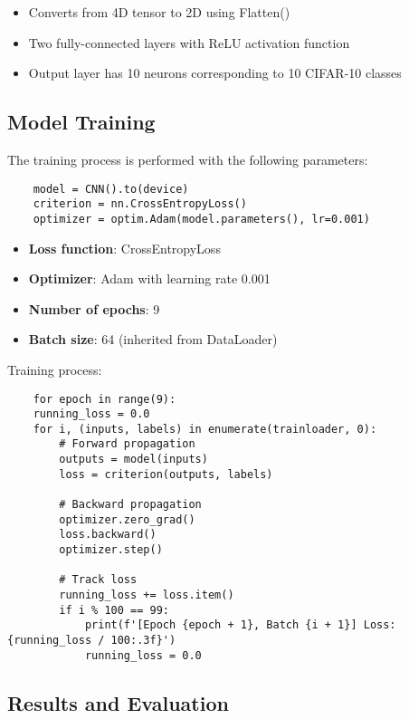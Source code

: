 \documentclass[12pt]{article}
\begin{document}
\begin{itemize}
    \item Converts from 4D tensor to 2D using Flatten()
    \item Two fully-connected layers with ReLU activation function
    \item Output layer has 10 neurons corresponding to 10 CIFAR-10 classes
\end{itemize}

\subsection{Model Training}

The training process is performed with the following parameters:

\begin{verbatim}
    model = CNN().to(device)
    criterion = nn.CrossEntropyLoss()
    optimizer = optim.Adam(model.parameters(), lr=0.001)
\end{verbatim}

\begin{itemize}
    \item \textbf{Loss function}: CrossEntropyLoss
    \item \textbf{Optimizer}: Adam with learning rate 0.001
    \item \textbf{Number of epochs}: 9
    \item \textbf{Batch size}: 64 (inherited from DataLoader)
\end{itemize}

Training process:

\begin{verbatim}
    for epoch in range(9):
    running_loss = 0.0
    for i, (inputs, labels) in enumerate(trainloader, 0):
        # Forward propagation
        outputs = model(inputs)
        loss = criterion(outputs, labels)
        
        # Backward propagation
        optimizer.zero_grad()
        loss.backward()
        optimizer.step()
        
        # Track loss
        running_loss += loss.item()
        if i % 100 == 99:
            print(f'[Epoch {epoch + 1}, Batch {i + 1}] Loss: {running_loss / 100:.3f}')
            running_loss = 0.0
\end{verbatim}

\subsection{Results and Evaluation}
\end{document}
